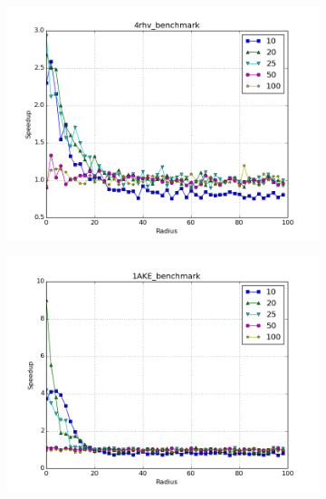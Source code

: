 \documentclass{amsbook}
\theoremstyle{definition}
\theoremstyle{remark}
\numberwithin{equation}{section}
\begin{document}
\begin{figure}[tbp]
    \centering
    \begin{subfigure}[b]{0.49\textwidth}
        \includegraphics[width=1\textwidth]{assets/4rhv_benchmark_euclid}
        \caption{}
    \end{subfigure}%
    \begin{subfigure}[b]{0.49\textwidth}
        \includegraphics[width=1\textwidth]{assets/1AKE_benchmark_euclid}
        \caption{}
    \end{subfigure}
    \begin{subfigure}[b]{0.49\textwidth}

\end{subfigure}
\end{figure}
\end{document}
